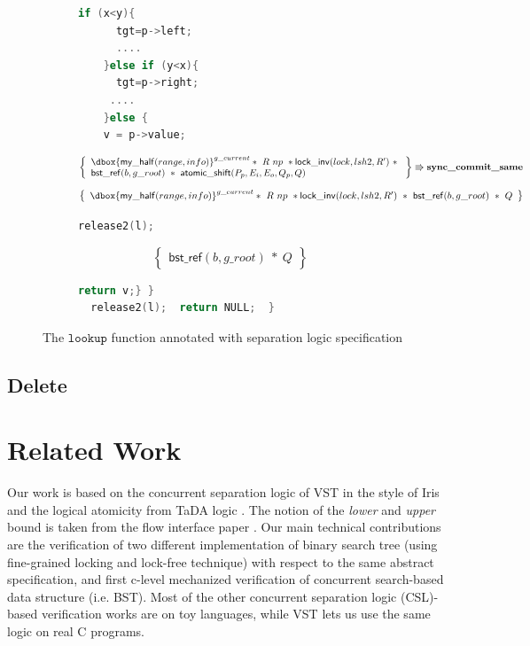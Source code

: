 \documentclass[acmsmall,screen]{acmart}\settopmatter{printfolios=true}
\newcommand\dboxed[1]{\dbox{\ensuremath{#1}}}
\newcommand{\ghost}[2]{\ensuremath{\dboxed{#1}^{#2}}}
\newcommand{\nodeboxrep}{\ensuremath{\mathsf{bst\_ref}}}
\begin{document}
\begin{figure}[htp]
\begin{subfigure}[t]{1\textwidth}
\begin{lstlisting}[language = C,  numbers = none]
    if (x<y){
      tgt=p->left;
      ....
    }else if (y<x){
      tgt=p->right;
     ....
    }else {
    v = p->value;
           \end{lstlisting} 
  $$\left\{\begin{array}{l} \ghost{\mathsf{my\_half}(range,info)}{g\_current}*\ R\ np\ *\mathsf{lock\_inv}(lock,lsh2,R')\ *\ \\\nodeboxrep(b,g\_root)\ *\ \mathsf{atomic\_shift}(P_p,E_i,E_o,Q_p,Q)\end{array}\right\} \Rrightarrow{\textbf{sync\_commit\_same}}$$
$$\left\{\begin{array}{l} \ghost{\mathsf{my\_half}(range,info)}{g\_current}*\ R\ np\ *\mathsf{lock\_inv}(lock,lsh2,R')\ *\ \nodeboxrep(b,g\_root)\ *\ Q\end{array}\right\}$$
        \begin{lstlisting}[language = C,  numbers = none]
      release2(l);
         \end{lstlisting}
       $$\left\{\begin{array}{l} \nodeboxrep(b,g\_root)\ *\ Q\end{array}\right\}$$
         \begin{lstlisting}[language = C, numbers = none]
       return v;} }
  release2(l);  return NULL;  }
 \end{lstlisting} 
\end{subfigure}
\caption{The $\texttt{lookup}$ function annotated with separation logic specification}
\label{lookupproof}
\end{figure} 

\subsection{Delete}

\section{Related Work}
\label{related}
Our work is based on the concurrent separation logic of VST in the style of Iris \cite{higherorderghoststate} and the logical atomicity from TaDA logic  \cite{tada}. The notion of the \emph{lower} and \emph{upper} bound is taken from the flow interface paper \cite{krishna2017flow}. Our main technical contributions are the verification of two different implementation of binary search tree (using fine-grained locking and lock-free technique) with respect to the same abstract specification, and first c-level mechanized verification of concurrent search-based data structure (i.e. BST). Most of the other concurrent separation logic (CSL)-based verification works are on toy languages, while VST lets us use the same logic on real C programs. 
\end{document}
